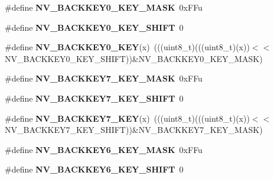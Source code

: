 \begin{DoxyCompactItemize}
\item 
\#define {\bfseries N\+V\+\_\+\+B\+A\+C\+K\+K\+E\+Y0\+\_\+\+K\+E\+Y\+\_\+\+M\+A\+SK}~0x\+F\+Fu\hypertarget{group__NV__Register__Masks_gafa0e31ca33d445d47d2fd89785e4ec9b}{}\label{group__NV__Register__Masks_gafa0e31ca33d445d47d2fd89785e4ec9b}

\item 
\#define {\bfseries N\+V\+\_\+\+B\+A\+C\+K\+K\+E\+Y0\+\_\+\+K\+E\+Y\+\_\+\+S\+H\+I\+FT}~0\hypertarget{group__NV__Register__Masks_ga381e2b0a778da31fa6c795550e71aed8}{}\label{group__NV__Register__Masks_ga381e2b0a778da31fa6c795550e71aed8}

\item 
\#define {\bfseries N\+V\+\_\+\+B\+A\+C\+K\+K\+E\+Y0\+\_\+\+K\+EY}(x)~(((uint8\+\_\+t)(((uint8\+\_\+t)(x))$<$$<$N\+V\+\_\+\+B\+A\+C\+K\+K\+E\+Y0\+\_\+\+K\+E\+Y\+\_\+\+S\+H\+I\+FT))\&N\+V\+\_\+\+B\+A\+C\+K\+K\+E\+Y0\+\_\+\+K\+E\+Y\+\_\+\+M\+A\+SK)\hypertarget{group__NV__Register__Masks_ga1806932e2ff643e0bd9d9718dd0921a4}{}\label{group__NV__Register__Masks_ga1806932e2ff643e0bd9d9718dd0921a4}

\item 
\#define {\bfseries N\+V\+\_\+\+B\+A\+C\+K\+K\+E\+Y7\+\_\+\+K\+E\+Y\+\_\+\+M\+A\+SK}~0x\+F\+Fu\hypertarget{group__NV__Register__Masks_gac3f2bc7dd55b7951d70a5d1fcb6552b8}{}\label{group__NV__Register__Masks_gac3f2bc7dd55b7951d70a5d1fcb6552b8}

\item 
\#define {\bfseries N\+V\+\_\+\+B\+A\+C\+K\+K\+E\+Y7\+\_\+\+K\+E\+Y\+\_\+\+S\+H\+I\+FT}~0\hypertarget{group__NV__Register__Masks_gad6bef74e61e792dfa5b7d195e4ce5620}{}\label{group__NV__Register__Masks_gad6bef74e61e792dfa5b7d195e4ce5620}

\item 
\#define {\bfseries N\+V\+\_\+\+B\+A\+C\+K\+K\+E\+Y7\+\_\+\+K\+EY}(x)~(((uint8\+\_\+t)(((uint8\+\_\+t)(x))$<$$<$N\+V\+\_\+\+B\+A\+C\+K\+K\+E\+Y7\+\_\+\+K\+E\+Y\+\_\+\+S\+H\+I\+FT))\&N\+V\+\_\+\+B\+A\+C\+K\+K\+E\+Y7\+\_\+\+K\+E\+Y\+\_\+\+M\+A\+SK)\hypertarget{group__NV__Register__Masks_ga2dbc4f6480af3ebaeeaf328a7f394c9f}{}\label{group__NV__Register__Masks_ga2dbc4f6480af3ebaeeaf328a7f394c9f}

\item 
\#define {\bfseries N\+V\+\_\+\+B\+A\+C\+K\+K\+E\+Y6\+\_\+\+K\+E\+Y\+\_\+\+M\+A\+SK}~0x\+F\+Fu\hypertarget{group__NV__Register__Masks_ga44e2d846ef1b9d5ad94a707fa6f29ae1}{}\label{group__NV__Register__Masks_ga44e2d846ef1b9d5ad94a707fa6f29ae1}

\item 
\#define {\bfseries N\+V\+\_\+\+B\+A\+C\+K\+K\+E\+Y6\+\_\+\+K\+E\+Y\+\_\+\+S\+H\+I\+FT}~0\hypertarget{group__NV__Register__Masks_ga271a532af55987843f56d660efb5d440}{}\label{group__NV__Register__Masks_ga271a532af55987843f56d660efb5d440}


\end{DoxyCompactItemize}
